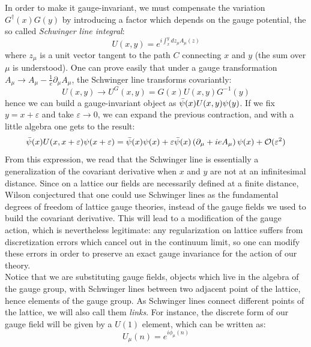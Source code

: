 In order to make it gauge-invariant, we must compensate the variation $G^\dagger (x) G(y)$ by introducing a factor which depends on the gauge potential, the so called \textit{Schwinger line integral}:
\begin{equation}
    U(x, y) = e^{i\int_x^y dz_\mu A_\mu(z)}
\end{equation}
where $z_\mu$ is a unit vector tangent to the path $C$ connecting $x$ and $y$ (the sum over $\mu$ is understood). One can prove easily that under a gauge transformation $A_\mu \to A_\mu - \frac{1}{e} \partial_\mu A_\mu$, the Schwinger line transforms covariantly:
\begin{equation}\label{bil1}
    U(x, y) \to U^G(x,y) = G(x) U(x, y) G^{-1}(y)
\end{equation}
hence we can build a gauge-invariant object as $\Bar{\psi}(x) U(x, y) \psi(y)$. If we fix $y = x + \varepsilon$ and take $\varepsilon \to 0$, we can expand the previous contraction, and with a little algebra one gets to the result:
\begin{equation}\label{bil2}
    \Bar{\psi}(x) U(x, x + \varepsilon) \psi(x + \varepsilon) = \Bar{\psi}(x) \psi(x) + \varepsilon \Bar{\psi}(x) \left( \partial_\mu + i e A_\mu \right) \psi(x) + \mathcal{O}(\varepsilon^2)
\end{equation}
From this expression, we read that the Schwinger line is essentially a generalization of the covariant derivative when $x$ and $y$ are not at an infinitesimal distance. Since on a lattice our fields are necessarily defined at a finite distance, Wilson conjectured that one could use Schwinger lines as the fundamental degrees of freedom of lattice gauge theories, instead of the gauge fields we used to build the covariant derivative. This will lead to a modification of the gauge action, which is nevertheless legitimate: any regularization on lattice suffers from discretization errors which cancel out in the continuum limit, so one can modify these errors in order to preserve an exact gauge invariance for the action of our theory.
\\ Notice that we are substituting gauge fields, objects which live in the algebra of the gauge group, with Schwinger lines between two adjacent point of the lattice, hence elements of the gauge group. As Schwinger lines connect different points of the lattice, we will also call them \textit{links}. For instance, the discrete form of our gauge field will be given by a $U(1)$ element, which can be written as:
\begin{equation}
    U_\mu (n) = e^{i \phi_\mu (n)}
\end{equation}
